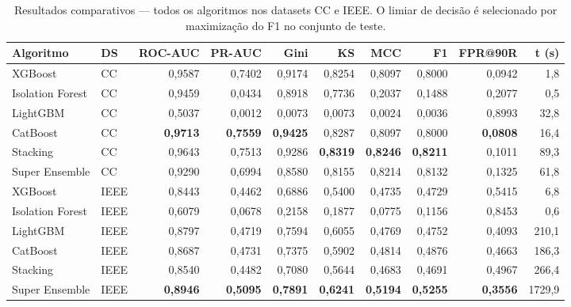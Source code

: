 \documentclass[12pt,a4paper]{article}
\begin{document}
\begin{table}[H]
  \centering
  \caption{Resultados comparativos — todos os algoritmos nos datasets CC e IEEE.
  O limiar de decisão é selecionado por maximização do F1 no conjunto de teste.}
  \label{tab:resultados}
  \small
  \setlength{\tabcolsep}{4pt}
  \begin{tabular}{llrrrrrrrr}
    \toprule
    \textbf{Algoritmo} & \textbf{DS} &
    \textbf{ROC-AUC} & \textbf{PR-AUC} & \textbf{Gini} & \textbf{KS} &
    \textbf{MCC} & \textbf{F1} & \textbf{FPR@90R} & \textbf{t (s)} \\
    \midrule
    XGBoost          & CC & 0,9587 & 0,7402 & 0,9174 & 0,8254 & 0,8097 & 0,8000 & 0,0942 &    1,8 \\
    Isolation Forest & CC & 0,9459 & 0,0434 & 0,8918 & 0,7736 & 0,2037 & 0,1488 & 0,2077 &    0,5 \\
    LightGBM         & CC & 0,5037 & 0,0012 & 0,0073 & 0,0073 & 0,0024 & 0,0036 & 0,8993 &   32,8 \\
    CatBoost         & CC & \textbf{0,9713} & \textbf{0,7559} & \textbf{0,9425} & 0,8287 & 0,8097 & 0,8000 & \textbf{0,0808} &   16,4 \\
    Stacking         & CC & 0,9643 & 0,7513 & 0,9286 & \textbf{0,8319} & \textbf{0,8246} & \textbf{0,8211} & 0,1011 &   89,3 \\
    Super Ensemble   & CC & 0,9290 & 0,6994 & 0,8580 & 0,8155 & 0,8214 & 0,8132 & 0,1325 &   61,8 \\
    \midrule
    XGBoost          & IEEE & 0,8443 & 0,4462 & 0,6886 & 0,5400 & 0,4735 & 0,4729 & 0,5415 &    6,8 \\
    Isolation Forest & IEEE & 0,6079 & 0,0678 & 0,2158 & 0,1877 & 0,0775 & 0,1156 & 0,8453 &    0,6 \\
    LightGBM         & IEEE & 0,8797 & 0,4719 & 0,7594 & 0,6055 & 0,4769 & 0,4752 & 0,4093 &  210,1 \\
    CatBoost         & IEEE & 0,8687 & 0,4731 & 0,7375 & 0,5902 & 0,4814 & 0,4876 & 0,4663 &  186,3 \\
    Stacking         & IEEE & 0,8540 & 0,4482 & 0,7080 & 0,5644 & 0,4683 & 0,4691 & 0,4967 &  266,4 \\
    Super Ensemble   & IEEE & \textbf{0,8946} & \textbf{0,5095} & \textbf{0,7891} & \textbf{0,6241} & \textbf{0,5194} & \textbf{0,5255} & \textbf{0,3556} & 1729,9 \\
    \bottomrule
  \end{tabular}
\end{table}
\end{document}
